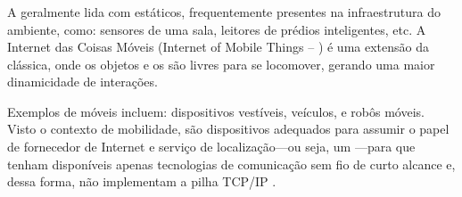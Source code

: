 \subsubsection{\iomt{}}

A \iot{} geralmente lida com \smartobjs{} estáticos, frequentemente presentes na infraestrutura do ambiente, como: sensores de uma sala, leitores \rfid{} de prédios inteligentes, etc. A Internet das Coisas Móveis (Internet of Mobile Things -- \iomt{}) é uma extensão da \iot{} clássica, onde os objetos e os \gateways{} são livres para se locomover, gerando uma maior dinamicidade de interações.

Exemplos de \smartobjs{} móveis incluem: dispositivos vestíveis, veículos, e robôs móveis. Visto o contexto de mobilidade, \smartphones{} são dispositivos adequados para assumir o papel de fornecedor de Internet e serviço de localização---ou seja, um \gateway{}---para \smartobjs{} que tenham disponíveis apenas tecnologias de comunicação sem fio de curto alcance e, dessa forma, não implementam a pilha TCP/IP \cite{talavera2015mobile}.

